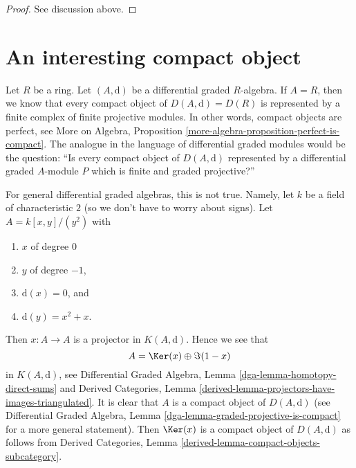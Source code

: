 \begin{proof}
See discussion above.
\end{proof}




\section{An interesting compact object}
\label{section-interesting-compact}


\noindent
Let $R$ be a ring. Let $(A, \text{d})$ be a differential graded $R$-algebra.
If $A = R$, then we know that every compact object of $D(A, \text{d}) = D(R)$
is represented by a finite complex of finite projective modules. In other
words, compact objects are perfect, see
More on Algebra, Proposition \ref{more-algebra-proposition-perfect-is-compact}.
The analogue in the language of differential graded modules would
be the question: ``Is every compact object of $D(A, \text{d})$ represented
by a differential graded $A$-module $P$ which is finite and
graded projective?''

\medskip\noindent
For general differential graded algebras, this is not true. Namely,
let $k$ be a field of characteristic $2$
(so we don't have to worry about signs).
Let $A = k[x, y]/(y^2)$
with
\begin{enumerate}
\item $x$ of degree $0$
\item $y$ of degree $-1$,
\item $\text{d}(x) = 0$, and
\item $\text{d}(y) = x^2 + x$.
\end{enumerate}
Then $x : A \to A$ is a projector in $K(A, \text{d})$.
Hence we see that
$$
A = \Ker(x) \oplus \Im(1 - x)
$$
in $K(A, \text{d})$, see
Differential Graded Algebra, Lemma \ref{dga-lemma-homotopy-direct-sums} and
Derived Categories, Lemma
\ref{derived-lemma-projectors-have-images-triangulated}.
It is clear that $A$ is a compact object of $D(A, \text{d})$
(see Differential Graded Algebra, Lemma
\ref{dga-lemma-graded-projective-is-compact} for
a more general statement).
Then $\Ker(x)$ is a compact object of $D(A, \text{d})$
as follows from
Derived Categories, Lemma \ref{derived-lemma-compact-objects-subcategory}.

